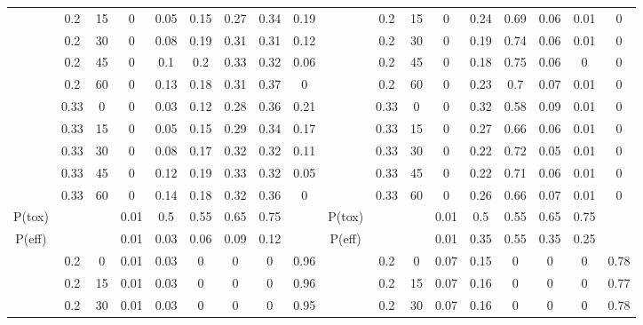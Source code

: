 \begin{table}
{\begin{tabular}[t]{cccccccc>{}c|ccccccccc}
			& 0.2 & 15 & 0 & 0.05 & 0.15 & 0.27 & 0.34 & 0.19 &  & 0.2 & 15 & 0 & 0.24 & 0.69 & 0.06 & 0.01 & 0\\
			
			& 0.2 & 30 & 0 & 0.08 & 0.19 & 0.31 & 0.31 & 0.12 &  & 0.2 & 30 & 0 & 0.19 & 0.74 & 0.06 & 0.01 & 0\\
			
			& 0.2 & 45 & 0 & 0.1 & 0.2 & 0.33 & 0.32 & 0.06 &  & 0.2 & 45 & 0 & 0.18 & 0.75 & 0.06 & 0 & 0\\
			
			& 0.2 & 60 & 0 & 0.13 & 0.18 & 0.31 & 0.37 & 0 &  & 0.2 & 60 & 0 & 0.23 & 0.7 & 0.07 & 0.01 & 0\\
			
			& 0.33 & 0 & 0 & 0.03 & 0.12 & 0.28 & 0.36 & 0.21 &  & 0.33 & 0 & 0 & 0.32 & 0.58 & 0.09 & 0.01 & 0\\
			
			& 0.33 & 15 & 0 & 0.05 & 0.15 & 0.29 & 0.34 & 0.17 &  & 0.33 & 15 & 0 & 0.27 & 0.66 & 0.06 & 0.01 & 0\\
			
			& 0.33 & 30 & 0 & 0.08 & 0.17 & 0.32 & 0.32 & 0.11 &  & 0.33 & 30 & 0 & 0.22 & 0.72 & 0.05 & 0.01 & 0\\
			
			& 0.33 & 45 & 0 & 0.12 & 0.19 & 0.33 & 0.32 & 0.05 &  & 0.33 & 45 & 0 & 0.22 & 0.71 & 0.06 & 0.01 & 0\\
			
			\multirow{-10}{*}{\centering\arraybackslash 3} & 0.33 & 60 & 0 & 0.14 & 0.18 & 0.32 & 0.36 & 0 & \multirow{-10}{*}{\centering\arraybackslash 9} & 0.33 & 60 & 0 & 0.26 & 0.66 & 0.07 & 0.01 & 0\\
			\cmidrule{1-18}
			P(tox) &  &  & 0.01 & 0.5 & 0.55 & 0.65 & 0.75 &  & P(tox) &  &  & 0.01 & 0.5 & 0.55 & 0.65 & 0.75 \vphantom{1} & \\
			\cmidrule{1-18}
			P(eff) &  &  & 0.01 & 0.03 & 0.06 & 0.09 & 0.12 &  & P(eff) &  &  & 0.01 & 0.35 & 0.55 & 0.35 & 0.25 & \\
			\cmidrule{1-18}
			& 0.2 & 0 & 0.01 & 0.03 & 0 & 0 & 0 & 0.96 &  & 0.2 & 0 & 0.07 & 0.15 & 0 & 0 & 0 & 0.78\\
			
			& 0.2 & 15 & 0.01 & 0.03 & 0 & 0 & 0 & 0.96 &  & 0.2 & 15 & 0.07 & 0.16 & 0 & 0 & 0 & 0.77\\
			
			& 0.2 & 30 & 0.01 & 0.03 & 0 & 0 & 0 & 0.95 &  & 0.2 & 30 & 0.07 & 0.16 & 0 & 0 & 0 & 0.78\\
			

\end{tabular}}
\end{table}
